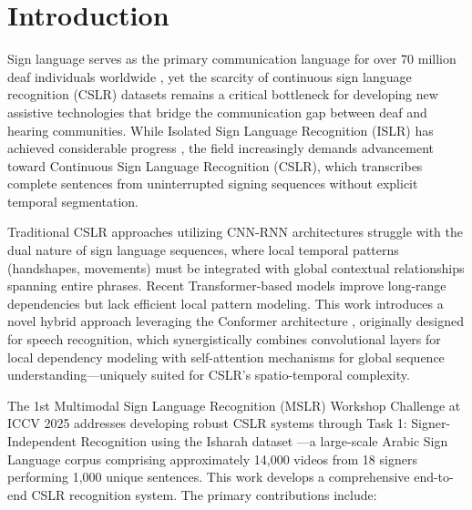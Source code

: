 \section{Introduction}
\label{sec:intro}
Sign language serves as the primary communication language for over 70 million deaf individuals worldwide \cite{who2025deafness}, yet the scarcity of continuous sign language recognition (CSLR) datasets remains a critical bottleneck for developing new assistive technologies that bridge the communication gap between deaf and hearing communities. While Isolated Sign Language Recognition (ISLR) has achieved considerable progress \cite{Sarhan_2023_ICCV}, the field increasingly demands advancement toward Continuous Sign Language Recognition (CSLR), which transcribes complete sentences from uninterrupted signing sequences without explicit temporal segmentation.

Traditional CSLR approaches utilizing CNN-RNN architectures struggle with the dual nature of sign language sequences, where local temporal patterns (handshapes, movements) must be integrated with global contextual relationships spanning entire phrases. Recent Transformer-based models \cite{vaswani2017attention} improve long-range dependencies but lack efficient local pattern modeling. This work introduces a novel hybrid approach leveraging the Conformer architecture \cite{gulati2020conformer}, originally designed for speech recognition, which synergistically combines convolutional layers for local dependency modeling with self-attention mechanisms for global sequence understanding—uniquely suited for CSLR's spatio-temporal complexity.

The 1st Multimodal Sign Language Recognition (MSLR) Workshop Challenge at ICCV 2025 \cite{mslr2025} addresses developing robust CSLR systems through Task 1: Signer-Independent Recognition using the Isharah dataset \cite{alyami2025isharahlargescalemultiscenedataset}—a large-scale Arabic Sign Language corpus comprising approximately 14,000 videos from 18 signers performing 1,000 unique sentences. This work develops a comprehensive end-to-end CSLR recognition system. The primary contributions include:

